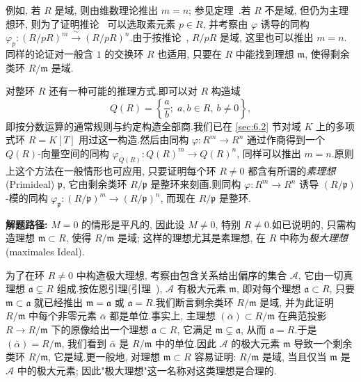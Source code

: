 例如, 若 $R$ 是域, 则由维数理论推出 $m = n$; 参见定理~.若 $R$ 不是域, 但仍为主理想环, 则为了证明推论~ 可以选取素元素 $p \in R$, 并考察由 $\varphi$ 诱导的同构 $\varphi_p \colon (R/pR)^m \xrightarrow{\ \sim\ } (R/pR)^n$.由于按推论~, $R/pR$ 是域, 这里也可以推出 $m = n$.同样的论证对一般含 $1$ 的交换环 $R$ 也适用, 只要在 $R$ 中能找到理想 $\mathfrak{m}$, 使得剩余类环 $R/\mathfrak{m}$ 是域.

对整环 $R$ 还有一种可能的推理方式.即可以对 $R$ 构造域
\[
Q(R) = \left\{\frac{a}{b};\; a, b \in R,\ b \neq 0\right\},
\]
即按分数运算的通常规则与约定构造全部商.我们已在 \ref{sec:6.2} 节对域 $K$ 上的多项式环 $R = K[T]$ 用过这一构造.然后由同构 $\varphi \colon R^m \longrightarrow R^n$ 通过作商得到一个 $Q(R)$-向量空间的同构 $\varphi_{Q(R)} \colon Q(R)^m \longrightarrow Q(R)^n$, 同样可以推出 $m = n$.原则上这个方法在一般情形也可应用, 只要证明每个环 $R \neq 0$ 都含有所谓的\emph{素理想}(\textup{Primideal}) $\mathfrak{p}$, 它由剩余类环 $R/\mathfrak{p}$ 是整环来刻画.则同构 $\varphi \colon R^m \longrightarrow R^n$ 诱导 $(R/\mathfrak{p})$-模的同构 $\varphi_{\mathfrak{p}} \colon (R/\mathfrak{p})^m \longrightarrow (R/\mathfrak{p})^n$, 而现在 $R/\mathfrak{p}$ 是整环.

\noindent\textbf{解题路径:} $M = 0$ 的情形是平凡的, 因此设 $M \neq 0$, 特别 $R \neq 0$.如已说明的, 只需构造理想 $\mathfrak{m} \subset R$, 使得 $R/\mathfrak{m}$ 是域; 这样的理想尤其是素理想, 在 $R$ 中称为\emph{极大理想}(\textup{maximales Ideal}).

为了在环 $R \neq 0$ 中构造极大理想, 考察由包含关系给出偏序的集合 $\mathcal{A}$, 它由一切真理想 $\mathfrak{a} \subsetneq R$ 组成.按佐恩引理(引理~), $\mathcal{A}$ 有极大元素 $\mathfrak{m}$, 即对每个理想 $\mathfrak{a} \subset R$, 只要 $\mathfrak{m} \subset \mathfrak{a}$ 就已经推出 $\mathfrak{m} = \mathfrak{a}$ 或 $\mathfrak{a} = R$.我们断言剩余类环 $R/\mathfrak{m}$ 是域, 并为此证明 $R/\mathfrak{m}$ 中每个非零元素 $\bar{\alpha}$ 都是单位.事实上, 主理想 $(\bar{\alpha}) \subset R/\mathfrak{m}$ 在典范投影 $R \longrightarrow R/\mathfrak{m}$ 下的原像给出一个理想 $\mathfrak{a} \subset R$, 它满足 $\mathfrak{m} \subsetneq \mathfrak{a}$, 从而 $\mathfrak{a} = R$.于是 $(\bar{\alpha}) = R/\mathfrak{m}$, 我们看到 $\bar{\alpha}$ 是 $R/\mathfrak{m}$ 中的单位.因此 $\mathcal{A}$ 的极大元素 $\mathfrak{m}$ 导致一个剩余类环 $R/\mathfrak{m}$, 它是域.更一般地, 对理想 $\mathfrak{m} \subset R$ 容易证明: $R/\mathfrak{m}$ 是域, 当且仅当 $\mathfrak{m}$ 是 $\mathcal{A}$ 中的极大元素; 因此"极大理想"这一名称对这类理想是合理的.


